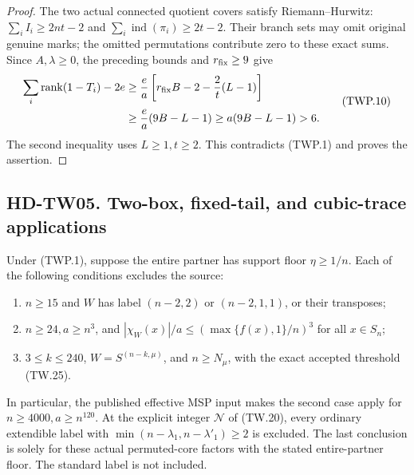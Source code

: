 \begin{proof}
The two actual connected quotient covers satisfy Riemann--Hurwitz:
\(\sum_i I_i\ge2nt-2\) and
\(\sum_i\operatorname{ind}(\pi_i)\ge2t-2\).
Their branch sets may omit original genuine marks; the omitted
permutations contribute zero to these exact sums. Since \(A,\lambda\ge0\),
the preceding bounds and \(r_{\rm fix}\ge9\) give
\[
 \begin{split}
 \sum_i\operatorname{rank}(1-T_i)-2e
 &\ge\frac ea\left[r_{\rm fix}B-2-\frac2t(L-1)\right]\\
 &\ge\frac ea(9B-L-1)
 \ge a(9B-L-1)>6.
 \end{split}\tag{TWP.10}
\]
The second inequality uses \(L\ge1,t\ge2\). This contradicts
(TWP.1) and proves the assertion.
\end{proof}

\subsection*{HD-TW05. Two-box, fixed-tail, and cubic-trace applications}

Under (TWP.1), suppose the entire partner has support floor
\(\eta\ge1/n\). Each of the following conditions excludes the source:
\begin{enumerate}
\item \(n\ge15\) and \(W\) has label \((n-2,2)\) or
\((n-2,1,1)\), or their transposes;
\item \(n\ge24,a\ge n^3\), and
\( |\chi_W(x)|/a\le(\max\{f(x),1\}/n)^3\) for all \(x\in S_n\);
\item \(3\le k\le240\), \(W=S^{(n-k,\mu)}\), and
\(n\ge N_\mu\), with the exact accepted threshold (TW.25).
\end{enumerate}
In particular, the published effective MSP input makes the second case
apply for \(n\ge4000,a\ge n^{120}\). At the explicit integer
\(\mathcal N\) of (TW.20), every ordinary extendible label with
\(\min(n-\lambda_1,n-\lambda'_1)\ge2\) is excluded.
The last conclusion is solely for these actual permuted-core factors
with the stated entire-partner floor. The standard label is not included.

